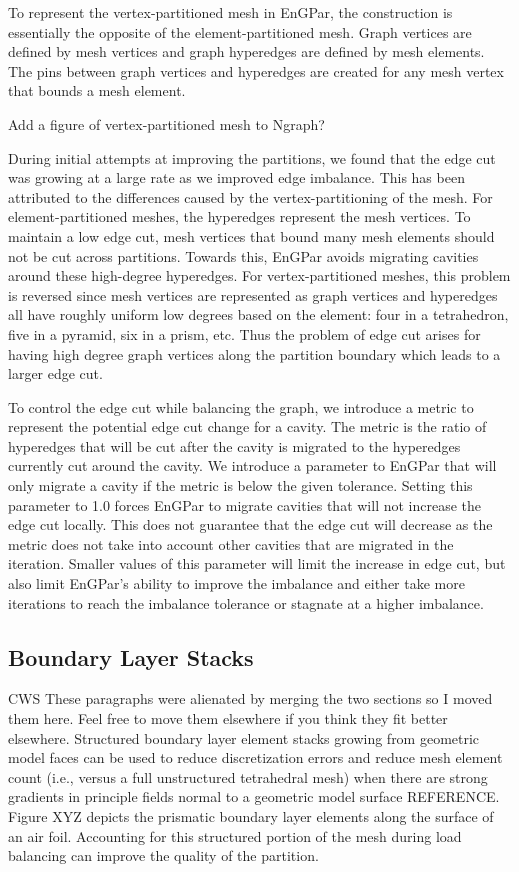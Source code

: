 \documentclass[conference]{IEEEtran}
\begin{document}
To represent the vertex-partitioned mesh in EnGPar, the construction
is essentially the opposite of the element-partitioned mesh. Graph
vertices are defined by mesh vertices and graph hyperedges are defined
by mesh elements. The pins between graph vertices and hyperedges are
created for any mesh vertex that bounds a mesh element.

{\color{red} Add a figure of vertex-partitioned mesh to Ngraph?}

During initial attempts at improving the partitions, we found that the edge cut was growing
at a large rate as we improved edge imbalance. This has been attributed to the differences
caused by the vertex-partitioning of the mesh. For element-partitioned meshes, the hyperedges
represent the mesh vertices. To maintain a low edge cut, mesh vertices that bound many mesh
elements should not be cut across partitions. Towards this, EnGPar avoids migrating cavities
around these high-degree hyperedges. For vertex-partitioned meshes, this problem is reversed
since mesh vertices are represented as graph vertices and hyperedges all have roughly uniform
low degrees based on the element: four in a tetrahedron, five in a pyramid, six in a prism, etc.
Thus the problem of edge cut arises for having high degree graph vertices along the partition
boundary which leads to a larger edge cut.

To control the edge cut while balancing the graph, we introduce a metric to represent the
potential edge cut change for a cavity. The metric is the ratio of hyperedges that will be cut
after the cavity is migrated to the hyperedges currently cut around the cavity. We introduce a
parameter to EnGPar that will only migrate a cavity if the metric is below the given tolerance.
Setting this parameter to 1.0 forces EnGPar to migrate cavities that will not increase the edge
cut locally. This does not guarantee that the edge cut will decrease as the metric does not take
into account other cavities that are migrated in the iteration. Smaller values of this
parameter will limit the increase in edge cut, but also limit EnGPar's ability to improve the
imbalance and either take more iterations to reach the imbalance tolerance or stagnate at a
higher imbalance.

\subsection{Boundary Layer Stacks}

{\color{red} CWS These paragraphs were alienated by merging the two sections so I moved them here. Feel free to move them elsewhere if you think they fit better elsewhere.}
Structured boundary layer element stacks growing from geometric model faces can
be used to reduce discretization errors and reduce mesh element count (i.e., versus
a full unstructured tetrahedral mesh) when there are strong gradients in
principle fields normal to a geometric model surface {\color{red} REFERENCE}.
Figure XYZ depicts the prismatic boundary layer elements along the surface of an
air foil.
Accounting for this structured portion of the mesh during load balancing can
improve the quality of the partition.
\end{document}
